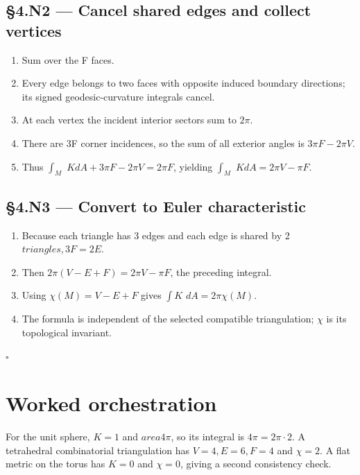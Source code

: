 \documentclass[preprint,12pt,aps,pra,showkeys,amsmath,amssymb,superscriptaddress,floatfix]{revtex4-2}
\theoremstyle{definition}
\theoremstyle{remark}
\begin{document}
\subsection{§4.N2 --- Cancel shared edges and collect
vertices}\label{n2-cancel-shared-edges-and-collect-vertices}

\begin{enumerate}
\def\labelenumi{\arabic{enumi}.}
\item
  Sum over the F faces.
\item
  Every edge belongs to two faces with opposite induced boundary
  directions; its signed geodesic-curvature integrals cancel.
\item
  At each vertex the incident interior sectors sum to \(2\pi\).
\item
  There are 3F corner incidences, so the sum of all exterior angles is
  \(3\pi F-2\pi V\).
\item
  Thus \(\int _M\) \(KdA+3\pi F-2\pi V=2\pi F\), yielding \(\int _M\)
  \(KdA=2\pi V-\pi F\).
\end{enumerate}

\subsection{§4.N3 --- Convert to Euler
characteristic}\label{n3-convert-to-euler-characteristic}

\begin{enumerate}
\def\labelenumi{\arabic{enumi}.}
\item
  Because each triangle has 3 edges and each edge is shared by 2
  \(triangles,3F=2E\).
\item
  Then \(2\pi (V-E+F)=2\pi V-\pi F\), the preceding integral.
\item
  Using \(\chi (M)=V-E+F\) gives \(\int K\) \(dA=2\pi \chi (M)\).
\item
  The formula is independent of the selected compatible triangulation;
  \(\chi\) is its topological invariant.
\end{enumerate}

\hfill$\square$

\section{Worked orchestration}

For the unit sphere, \(K=1\) and \(area4\pi\), so its integral is
\(4\pi =2\pi \cdot 2\). A tetrahedral combinatorial triangulation has
\(V=4,E=6,F=4\) and \(\chi =2\). A flat metric on the torus has \(K=0\)
and \(\chi =0\), giving a second consistency check.
\end{document}
